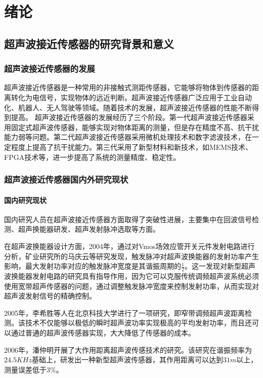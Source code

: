 	\newpage
	\section{绪论}
    \subsection{超声波接近传感器的研究背景和意义}
    \subsubsection{超声波接近传感器的发展}
    超声波接近传感器是一种常用的非接触式测距传感器，它能够将物体到传感器的距离转化为电信号，实现物体的远近判断。超声波接近传感器广泛应用于工业自动化、机器人、无人驾驶等领域。随着技术的发展，超声波接近传感器的性能不断得到提高。    
    超声波接近传感器的发展经历了三个阶段。第一代超声波接近传感器采用固定式超声波传感器，能够实现对物体距离的测量，但是存在精度不高、抗干扰能力弱等问题。第二代超声波接近传感器采用微机处理技术和数字滤波技术，在一定程度上提高了抗干扰能力。第三代采用了新型材料和新技术，如MEMS技术、FPGA技术等，进一步提高了系统的测量精度、稳定性。
    \subsubsection{超声波接近传感器国内外研究现状}
    \paragraph{国内研究现状}
	国内研究人员在超声波接近传感器方面取得了突破性进展，主要集中在回波信号检测、超声换能器研发、超声发射脉冲选取等方面。
	
	在超声波换能器设计方面，2004年，通过对Vmos场效应管开关元件发射电路进行分析，矿业研究所的马庆云等研究发现，触发脉冲对超声波换能器的发射功率产生影响，最大发射功率对应的触发脉冲宽度是其谐振周期的$\frac{1}{2}$。这一发现对新型超声波换能器发射电路的研究具有指导作用，因为它可以克服传统调频超声波系统必须使用宽带超声传感器的问题，通过调整触发脉冲宽度来控制发射功率，从而实现对超声波发射信号的精确控制。
	
	2005年，李希胜等人在北京科技大学进行了一项研究，即窄带调频超声波距离检测。该技术不仅能够以极低的瞬时超声波功率实现极高的平均发射功率，而且还可以通过普通的超声波传感器实现，大大降低了传感器的成本。
	
	2006年，潘仲明开展了大作用距离超声波传感技术的研究。该研究在谐振频率为$24.5KHz$基础上，研发出一种新型超声波传感器，其作用距离可以达到$31m$以上，测量误差低于$3\%$。
		
